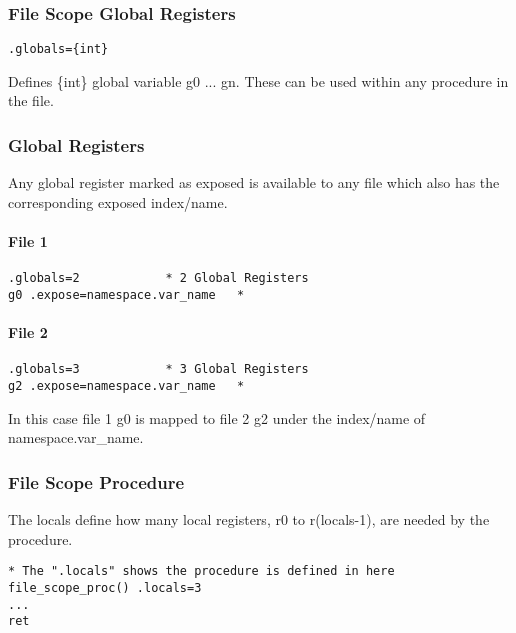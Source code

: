 \subsubsection{File Scope Global Registers}

\begin{verbatim}
.globals={int}
\end{verbatim}

Defines \{int\} global variable g0 ... gn. These can be used
within any procedure in the file.

\subsubsection{Global Registers}

Any global register marked as exposed is available to any file
which also has the corresponding exposed index/name.

\paragraph{File 1}

\begin{verbatim}
.globals=2            * 2 Global Registers
g0 .expose=namespace.var_name   * 
\end{verbatim}

\paragraph{File 2}

\begin{verbatim}
.globals=3            * 3 Global Registers
g2 .expose=namespace.var_name   * 
\end{verbatim}

In this case file 1 g0 is mapped to file 2 g2 under the
index/name of \textquotedbl{}namespace.var\_name\textquotedbl{}.

\subsubsection{File Scope Procedure}

The locals define how many local registers, r0 to r(locals-1), are needed by the procedure.

\begin{verbatim}
* The ".locals" shows the procedure is defined in here
file_scope_proc() .locals=3
...
ret
\end{verbatim}


